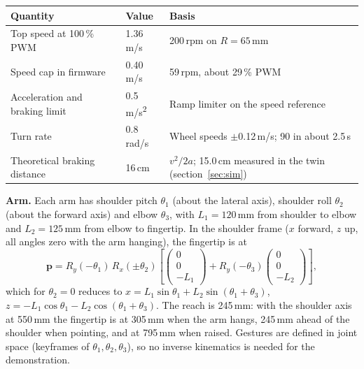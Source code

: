 \documentclass[11pt,a4paper]{article}
\renewcommand{\deg}{\textdegree}
\begin{document}
\begin{table}[H]\small
\begin{tabularx}{\linewidth}{@{}LP{28mm}L@{}}
\toprule
\textbf{Quantity} & \textbf{Value} & \textbf{Basis}\\
\midrule
Top speed at 100\,\% PWM & 1.36\,m/s & 200\,rpm on $R=65$\,mm\\
Speed cap in firmware & 0.40\,m/s & 59\,rpm, about 29\,\% PWM\\
Acceleration and braking limit & 0.5\,m/s\textsuperscript{2} & Ramp limiter on the speed reference\\
Turn rate & 0.8\,rad/s & Wheel speeds $\pm$0.12\,m/s; 90\deg{} in about 2.5\,s\\
Theoretical braking distance & 16\,cm & $v^2/2a$; 15.0\,cm measured in the twin (section~\ref{sec:sim})\\
\bottomrule
\end{tabularx}
\end{table}

\textbf{Arm.} Each arm has shoulder pitch $\theta_1$ (about the lateral axis), shoulder roll $\theta_2$ (about the forward axis) and elbow $\theta_3$, with $L_1 = 120$\,mm from shoulder to elbow and $L_2 = 125$\,mm from elbow to fingertip. In the shoulder frame ($x$ forward, $z$ up, all angles zero with the arm hanging), the fingertip is at
\[ \mathbf{p} = R_y(-\theta_1)\,R_x(\pm\theta_2)\left[\begin{pmatrix}0\\0\\-L_1\end{pmatrix} + R_y(-\theta_3)\begin{pmatrix}0\\0\\-L_2\end{pmatrix}\right], \]
which for $\theta_2=0$ reduces to $x = L_1\sin\theta_1 + L_2\sin(\theta_1+\theta_3)$, $z = -L_1\cos\theta_1 - L_2\cos(\theta_1+\theta_3)$. The reach is 245\,mm: with the shoulder axis at 550\,mm the fingertip is at 305\,mm when the arm hangs, 245\,mm ahead of the shoulder when pointing, and at 795\,mm when raised. Gestures are defined in joint space (keyframes of $\theta_1,\theta_2,\theta_3$), so no inverse kinematics is needed for the demonstration.
\end{document}
